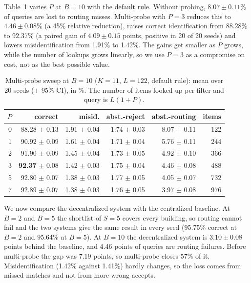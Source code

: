 \documentclass[runningheads]{llncs}
\begin{document}
Table~\ref{tab:probe} varies $P$ at $B=10$ with the default rule. Without probing, $8.07 \pm 0.11\%$ of queries are lost
to routing misses. Multi-probe with $P=3$ reduces this to $4.46 \pm 0.08\%$ (a 45\% relative reduction), raises
correct identification from $88.28\%$ to $92.37\%$ (a paired gain of $4.09 \pm 0.15$ points, positive in
20 of 20 seeds) and lowers misidentification from 1.91\% to 1.42\%. The gains get smaller as $P$
grows, while the number of lookups grows linearly, so we use $P=3$ as a compromise on cost, not as the best possible
value.

\begin{table}[htbp]
\caption{Multi-probe sweep at $B=10$ ($K=11$, $L=122$, default rule): mean over 20 seeds ($\pm$ 95\% CI), in \%. The
number of items looked up per filter and query is $L(1+P)$.}
\label{tab:probe}
\small
\setlength{\tabcolsep}{3.5pt}
\renewcommand{\arraystretch}{1.25}
\begin{tabular}{|r|r|r|r|r|r|}
\hline
$P$ & correct & misid. & abst.-reject & abst.-routing & items \\
\hline
0 & 88.28 $\pm$ 0.13 & 1.91 $\pm$ 0.04 & 1.74 $\pm$ 0.03 & 8.07 $\pm$ 0.11 & 122 \\
1 & 90.92 $\pm$ 0.09 & 1.61 $\pm$ 0.04 & 1.71 $\pm$ 0.04 & 5.76 $\pm$ 0.11 & 244 \\
2 & 91.90 $\pm$ 0.09 & 1.45 $\pm$ 0.04 & 1.73 $\pm$ 0.05 & 4.92 $\pm$ 0.10 & 366 \\
3 & \textbf{92.37} $\pm$ 0.08 & 1.42 $\pm$ 0.03 & 1.75 $\pm$ 0.04 & 4.46 $\pm$ 0.08 & 488 \\
5 & 92.80 $\pm$ 0.07 & 1.38 $\pm$ 0.03 & 1.77 $\pm$ 0.05 & 4.05 $\pm$ 0.07 & 732 \\
7 & 92.89 $\pm$ 0.07 & 1.38 $\pm$ 0.03 & 1.76 $\pm$ 0.05 & 3.97 $\pm$ 0.08 & 976 \\
\hline
\end{tabular}
\end{table}

\noindent We now compare the decentralized system with the centralized baseline. At $B=2$ and $B=5$ the shortlist of
$S=5$ covers every building, so routing cannot fail and the two systems give the same result in every seed
(95.75\% correct at $B=2$ and 95.64\% at $B=5$). At $B=10$ the decentralized system is $3.10 \pm 0.08$ points behind the
baseline, and 4.46 points of queries are routing failures. Before multi-probe the gap was 7.19 points, so
multi-probe closes 57\% of it. Misidentification (1.42\% against 1.41\%) hardly changes, so the
loss comes from missed matches and not from more wrong accepts.
\end{document}
